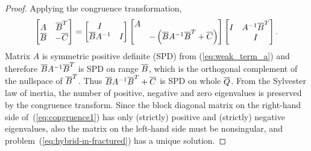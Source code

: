 \begin{proof}
{Applying the congruence transformation,
\begin{equation}
\label{eq:congruence1}
\left[
\begin{matrix}
A        & \overline{B}^T  \\
\overline{B}   & -\overline{C}
\end{matrix}
\right]
=
\left[
\begin{matrix}
I                 &   \\
\overline{B} A^{-1} & I
\end{matrix}
\right]
\left[
\begin{matrix}
A &   \\
& -\left( \overline{B}A^{-1}\overline{B}^T + \overline{C} \right)
\end{matrix}
\right]
\left[
\begin{matrix}
I    & A^{-1} \overline{B}^T \\
& I
\end{matrix}
\right].
\end{equation}
Matrix $A$ is symmetric positive definite (SPD) from (\ref{eq:weak_term_a})
and therefore  $\overline{B}A^{-1}\overline{B}^T$ is SPD on range $\overline{B}$, which is 
the orthogonal complement of the nullspace of $\overline{B}^T$.
Thus $\overline{B}A^{-1}\overline{B}^T + \overline{C}$ is SPD on whole $\overline{Q}$.
From the Sylvester law of inertia, the number of positive, negative and zero 
eigenvalues is preserved by the congruence transform.
Since the block diagonal matrix on the right-hand side of~(\ref{eq:congruence1}) has only (strictly) positive and (strictly) negative eigenvalues,
also the matrix on the left-hand side must be nonsingular,
and problem~(\ref{eq:hybrid-m-fractured}) has a unique solution.

}
\end{proof}
